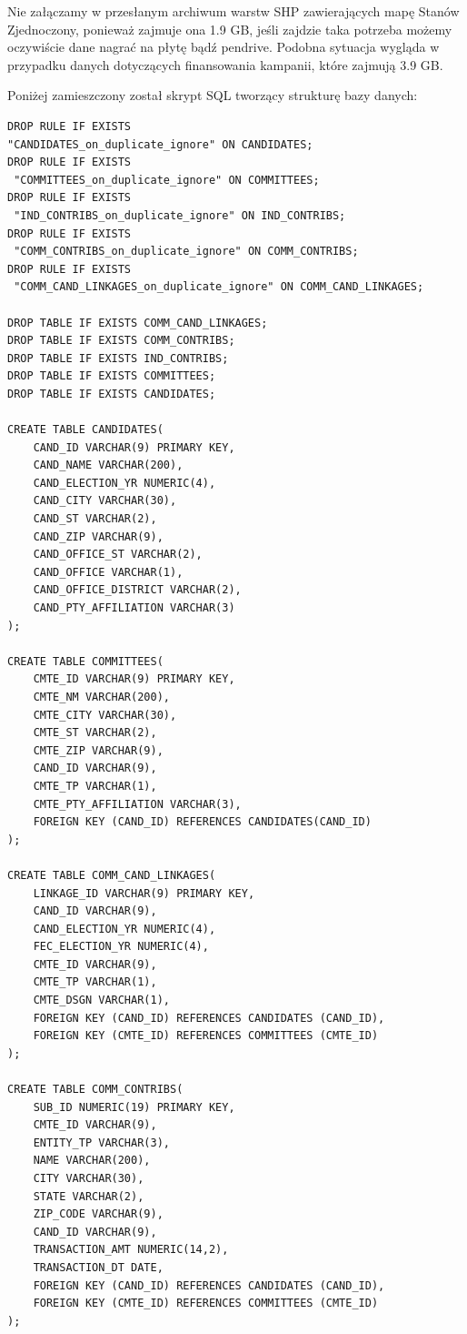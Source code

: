 \documentclass[10pt,a4paper]{article}
\begin{document}
Nie załączamy w przesłanym archiwum warstw SHP zawierających mapę Stanów Zjednoczony, ponieważ zajmuje ona 1.9 GB, jeśli zajdzie taka potrzeba możemy oczywiście dane nagrać na płytę bądź pendrive. Podobna sytuacja wygląda w przypadku danych dotyczących finansowania kampanii, które zajmują 3.9 GB.
\bigskip

Poniżej zamieszczony został skrypt SQL tworzący strukturę bazy danych:
\begin{lstlisting}[style=BashInputStyle]
DROP RULE IF EXISTS 
"CANDIDATES_on_duplicate_ignore" ON CANDIDATES;
DROP RULE IF EXISTS
 "COMMITTEES_on_duplicate_ignore" ON COMMITTEES;
DROP RULE IF EXISTS
 "IND_CONTRIBS_on_duplicate_ignore" ON IND_CONTRIBS;
DROP RULE IF EXISTS
 "COMM_CONTRIBS_on_duplicate_ignore" ON COMM_CONTRIBS;
DROP RULE IF EXISTS
 "COMM_CAND_LINKAGES_on_duplicate_ignore" ON COMM_CAND_LINKAGES;

DROP TABLE IF EXISTS COMM_CAND_LINKAGES;
DROP TABLE IF EXISTS COMM_CONTRIBS;
DROP TABLE IF EXISTS IND_CONTRIBS;
DROP TABLE IF EXISTS COMMITTEES;
DROP TABLE IF EXISTS CANDIDATES;

CREATE TABLE CANDIDATES(
    CAND_ID VARCHAR(9) PRIMARY KEY,
    CAND_NAME VARCHAR(200),
    CAND_ELECTION_YR NUMERIC(4),
    CAND_CITY VARCHAR(30),
    CAND_ST VARCHAR(2),
    CAND_ZIP VARCHAR(9),
    CAND_OFFICE_ST VARCHAR(2),
    CAND_OFFICE VARCHAR(1),
    CAND_OFFICE_DISTRICT VARCHAR(2),
    CAND_PTY_AFFILIATION VARCHAR(3)
);

CREATE TABLE COMMITTEES(
    CMTE_ID VARCHAR(9) PRIMARY KEY,
    CMTE_NM VARCHAR(200),
    CMTE_CITY VARCHAR(30),
    CMTE_ST VARCHAR(2),
    CMTE_ZIP VARCHAR(9),
    CAND_ID VARCHAR(9),
    CMTE_TP VARCHAR(1),
    CMTE_PTY_AFFILIATION VARCHAR(3),
    FOREIGN KEY (CAND_ID) REFERENCES CANDIDATES(CAND_ID)
);

CREATE TABLE COMM_CAND_LINKAGES(
    LINKAGE_ID VARCHAR(9) PRIMARY KEY,
    CAND_ID VARCHAR(9),
    CAND_ELECTION_YR NUMERIC(4),
    FEC_ELECTION_YR NUMERIC(4),
    CMTE_ID VARCHAR(9),
    CMTE_TP VARCHAR(1),
    CMTE_DSGN VARCHAR(1),
    FOREIGN KEY (CAND_ID) REFERENCES CANDIDATES (CAND_ID),
    FOREIGN KEY (CMTE_ID) REFERENCES COMMITTEES (CMTE_ID)
);

CREATE TABLE COMM_CONTRIBS(
    SUB_ID NUMERIC(19) PRIMARY KEY,
    CMTE_ID VARCHAR(9),
    ENTITY_TP VARCHAR(3),
    NAME VARCHAR(200),
    CITY VARCHAR(30),
    STATE VARCHAR(2),
    ZIP_CODE VARCHAR(9),
    CAND_ID VARCHAR(9),
    TRANSACTION_AMT NUMERIC(14,2),
    TRANSACTION_DT DATE,
    FOREIGN KEY (CAND_ID) REFERENCES CANDIDATES (CAND_ID),
    FOREIGN KEY (CMTE_ID) REFERENCES COMMITTEES (CMTE_ID)
);


\end{lstlisting}
\end{document}
